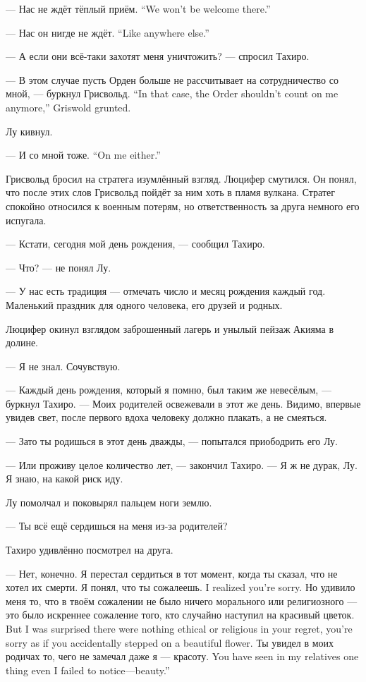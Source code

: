 {--- Нас не ждёт тёплый приём.}
{``We won't be welcome there.''}

{--- Нас он нигде не ждёт.}
{``Like anywhere else.''}

--- А если они всё-таки захотят меня уничтожить? --- спросил Тахиро.

{--- В этом случае пусть Орден больше не рассчитывает на сотрудничество со мной, --- буркнул Грисвольд.}
{``In that case, the Order shouldn't count on me anymore,'' Griswold grunted.}

Лу кивнул.

{--- И со мной тоже.}
{``On me either.''}

Грисвольд бросил на стратега изумлённый взгляд.
Люцифер смутился.
Он понял, что после этих слов Грисвольд пойдёт за ним хоть в пламя вулкана.
Стратег спокойно относился к военным потерям, но ответственность за друга немного его испугала.

--- Кстати, сегодня мой день рождения, --- сообщил Тахиро.

--- Что? --- не понял Лу.

--- У нас есть традиция --- отмечать число и месяц рождения каждый год.
Маленький праздник для одного человека, его друзей и родных.

Люцифер окинул взглядом заброшенный лагерь и унылый пейзаж Акияма в долине.

--- Я не знал.
Сочувствую.

--- Каждый день рождения, который я помню, был таким же невесёлым, --- буркнул Тахиро.
--- Моих родителей освежевали в этот же день.
Видимо, впервые увидев свет, после первого вдоха человеку должно плакать, а не смеяться.

--- Зато ты родишься в этот день дважды, --- попытался приободрить его Лу.

--- Или проживу целое количество лет, --- закончил Тахиро.
--- Я ж не дурак, Лу.
Я знаю, на какой риск иду.

Лу помолчал и поковырял пальцем ноги землю.

--- Ты всё ещё сердишься на меня из-за родителей?

Тахиро удивлённо посмотрел на друга.

--- Нет, конечно.
Я перестал сердиться в тот момент, когда ты сказал, что не хотел их смерти.
{Я понял, что ты сожалеешь.}
{I realized you're sorry.}
{Но удивило меня то, что в твоём сожалении не было ничего морального или религиозного --- это было искреннее сожаление того, кто случайно наступил на красивый цветок.}
{But I was surprised there were nothing ethical or religious in your regret, you're sorry as if you accidentally stepped on a beautiful flower.}
{Ты увидел в моих родичах то, чего не замечал даже я --- красоту.}
{You have seen in my relatives one thing even I failed to notice---beauty.''}

